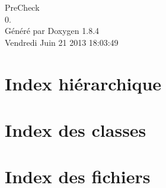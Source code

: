 \documentclass[twoside]{book}
\newcommand{\clearemptydoublepage}{%
  \newpage{\pagestyle{empty}\cleardoublepage}%
}
\begin{document}
\hypersetup{pageanchor=false}
\begin{titlepage}
\vspace*{7cm}
\begin{center}%
{\Large Pre\-Check \\[1ex]\large 0. }\\
\vspace*{1cm}
{\large Généré par Doxygen 1.8.4}\\
\vspace*{0.5cm}
{\small Vendredi Juin 21 2013 18:03:49}\\
\end{center}
\end{titlepage}
\clearemptydoublepage
\tableofcontents
\clearemptydoublepage
{}
\hypersetup{pageanchor=true}

\chapter{Index hiérarchique}

\chapter{Index des classes}

\chapter{Index des fichiers}

\end{document}
